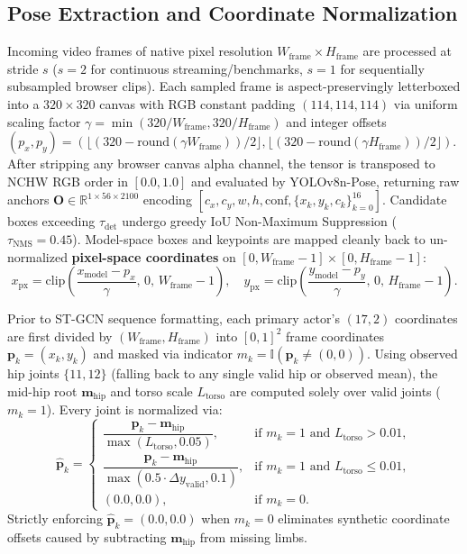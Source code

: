 \documentclass[conference]{IEEEtran}
\begin{document}
\subsection{Pose Extraction and Coordinate Normalization}
Incoming video frames of native pixel resolution $W_{\text{frame}} \times H_{\text{frame}}$ are processed at stride $s$ ($s=2$ for continuous streaming/benchmarks, $s=1$ for sequentially subsampled browser clips). Each sampled frame is aspect-preservingly letterboxed into a $320 \times 320$ canvas with RGB constant padding $(114, 114, 114)$ via uniform scaling factor $\gamma = \min(320/W_{\text{frame}}, 320/H_{\text{frame}})$ and integer offsets $(p_x, p_y) = (\lfloor(320 - \text{round}(\gamma W_{\text{frame}}))/2\rfloor, \lfloor(320 - \text{round}(\gamma H_{\text{frame}}))/2\rfloor)$. After stripping any browser canvas alpha channel, the tensor is transposed to NCHW RGB order in $[0.0, 1.0]$ and evaluated by \mbox{YOLOv8n-Pose}, returning raw anchors $\mathbf{O} \in \mathbb{R}^{1 \times 56 \times 2100}$ encoding $[c_x, c_y, w, h, \text{conf}, \{x_k, y_k, c_k\}_{k=0}^{16}]$. Candidate boxes exceeding $\tau_{\text{det}}$ undergo greedy IoU Non-Maximum Suppression ($\tau_{\text{NMS}} = 0.45$). Model-space boxes and keypoints are mapped cleanly back to un-normalized \textbf{pixel-space coordinates} on $[0, W_{\text{frame}}-1] \times [0, H_{\text{frame}}-1]$:
\begin{equation}
x_{\text{px}} = \text{clip}\!\left(\frac{x_{\text{model}} - p_x}{\gamma},\, 0,\, W_{\text{frame}}-1\right), \quad
y_{\text{px}} = \text{clip}\!\left(\frac{y_{\text{model}} - p_y}{\gamma},\, 0,\, H_{\text{frame}}-1\right).
\end{equation}

Prior to ST-GCN sequence formatting, each primary actor's $(17, 2)$ coordinates are first divided by $(W_{\text{frame}}, H_{\text{frame}})$ into $[0, 1]^2$ frame coordinates $\mathbf{p}_k = (x_k, y_k)$ and masked via indicator $m_k = \mathbb{I}(\mathbf{p}_k \neq (0, 0))$. Using observed hip joints $\{11, 12\}$ (falling back to any single valid hip or observed mean), the mid-hip root $\mathbf{m}_{\text{hip}}$ and torso scale $L_{\text{torso}}$ are computed solely over valid joints ($m_k = 1$). Every joint is normalized via:
\begin{equation}
\hat{\mathbf{p}}_k =
\begin{cases}
\dfrac{\mathbf{p}_k - \mathbf{m}_{\text{hip}}}{\max(L_{\text{torso}}, 0.05)}, & \text{if } m_k = 1 \text{ and } L_{\text{torso}} > 0.01, \\
\dfrac{\mathbf{p}_k - \mathbf{m}_{\text{hip}}}{\max(0.5 \cdot \Delta y_{\text{valid}}, 0.1)}, & \text{if } m_k = 1 \text{ and } L_{\text{torso}} \le 0.01, \\
(0.0, 0.0), & \text{if } m_k = 0.
\end{cases}
\end{equation}
Strictly enforcing $\hat{\mathbf{p}}_k = (0.0, 0.0)$ when $m_k = 0$ eliminates synthetic coordinate offsets caused by subtracting $\mathbf{m}_{\text{hip}}$ from missing limbs.
\end{document}
